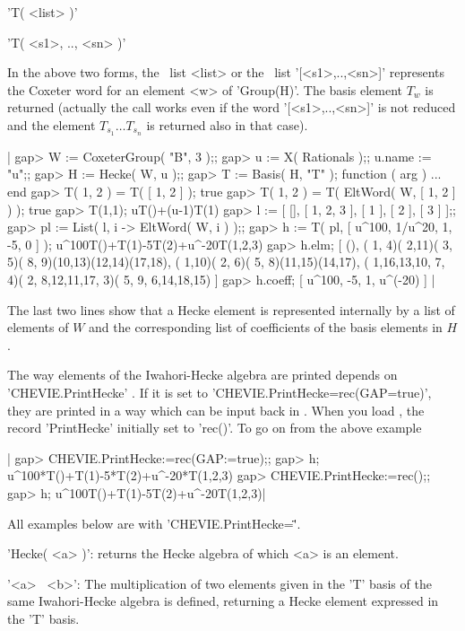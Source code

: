 'T( <list> )'

'T( <s1>, .., <sn> )'

In  the  above two  forms,  the  \GAP\ list  <list>  or  the \GAP\  list
'[<s1>,..,<sn>]'  represents the  Coxeter  word for  an  element <w>  of
'Group(H)'. The basis element $T_w$ is returned (actually the call works
even  if  the word  '[<s1>,..,<sn>]'  is  not  reduced and  the  element
$T_{s_1}\ldots T_{s_n}$ is returned also in that case).

|    gap> W := CoxeterGroup( "B", 3 );;
    gap> u := X( Rationals );; u.name := "u";;
    gap> H := Hecke( W, u );;
    gap> T := Basis( H, "T" );
    function ( arg ) ... end
    gap> T( 1, 2 ) = T( [ 1, 2 ] );
    true
    gap> T( 1, 2 ) = T( EltWord( W, [ 1, 2 ] ) );
    true
    gap> T(1,1);
    uT()+(u-1)T(1)
    gap> l := [ [], [ 1, 2, 3 ], [ 1 ], [ 2 ], [ 3 ] ];;
    gap> pl := List( l, i -> EltWord( W, i ) );;
    gap> h := T( pl, [ u^100, 1/u^20, 1, -5, 0 ] );
    u^100T()+T(1)-5T(2)+u^-20T(1,2,3)
    gap> h.elm;
    [ (), ( 1, 4)( 2,11)( 3, 5)( 8, 9)(10,13)(12,14)(17,18),
      ( 1,10)( 2, 6)( 5, 8)(11,15)(14,17),
      ( 1,16,13,10, 7, 4)( 2, 8,12,11,17, 3)( 5, 9, 6,14,18,15) ]
    gap> h.coeff;
    [ u^100, -5, 1, u^(-20) ] |

The last two lines show that a Hecke element is represented internally by a
list  of elements of $W$ and the  corresponding list of coefficients of the
basis elements in $H$.

The  way  elements  of  the  Iwahori-Hecke  algebra  are printed depends on
'CHEVIE.PrintHecke' . If it is set to
'CHEVIE.PrintHecke\:=rec(GAP\:=true)',  they are printed in a way which can
be  input back  in \GAP.  When you  load {\CHEVIE}, the record 'PrintHecke'
initially set to 'rec()'. To go on from the above example\:

|    gap> CHEVIE.PrintHecke:=rec(GAP:=true);;
    gap> h;
    u^100*T()+T(1)-5*T(2)+u^-20*T(1,2,3)
    gap> CHEVIE.PrintHecke:=rec();;
    gap> h;
    u^100T()+T(1)-5T(2)+u^-20T(1,2,3)|


All examples below are with 'CHEVIE.PrintHecke=\"\"'.

'Hecke( <a> )': returns the Hecke algebra of which <a> is an element.

'<a> \*\ <b>':
The  multiplication of  two elements  given in  the 'T'  basis of  the same
Iwahori-Hecke  algebra is defined,  returning a Hecke  element expressed in
the 'T' basis.

